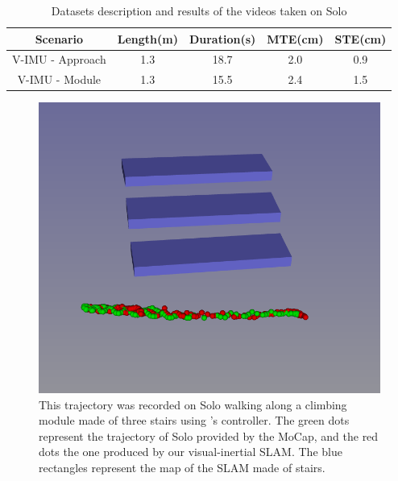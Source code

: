 \begin{table}%
   \begin{center}
   \caption{Datasets description and results of the videos taken on Solo}
   \label{table:solo}
    \begin{tabular}{|c|c|c|c|c|}
        \hline 
        Scenario  & Length(m) & Duration(s) & MTE(cm) & STE(cm) \\
        \hline 
         V-IMU - Approach & 1.3 & 18.7 & 2.0 & 0.9\\
        \hline 
         V-IMU - Module & 1.3 & 15.5 & 2.4 & 1.5 \\
        \hline
    \end{tabular}
    \end{center}
\end{table}

\begin{figure}[!ht]
  \centering
  \includegraphics[width=\linewidth]{figures/cosyslam/mapped_stairs.png}
  \caption{This trajectory was recorded on Solo walking along a climbing module made of three stairs using \cite{leziart:hal-03052451}'s controller. 
  The green dots represent the trajectory of Solo provided by the MoCap, and the red dots the one produced by our visual-inertial SLAM. 
  The blue rectangles represent the map of the SLAM made of stairs.}
  \label{fig:map_stairs}
\end{figure}
